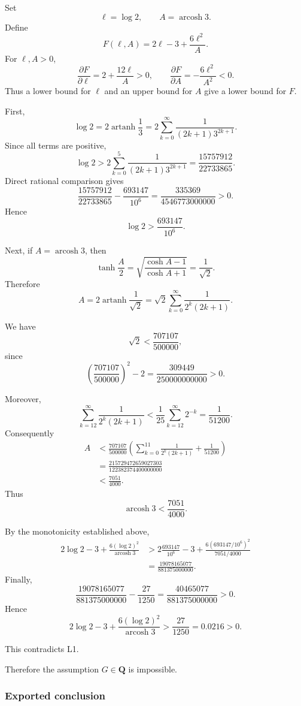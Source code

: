 \documentclass[
  10pt,
  letterpaper,
]{article}
\theoremstyle{definition}
\theoremstyle{remark}
\begin{document}
Set \[
\ell=\log2,
\qquad
A=\operatorname{arcosh}3.
\] Define \[
F(\ell,A)=2\ell-3+\frac{6\ell^2}{A}.
\] For \(\ell,A>0\), \[
\frac{\partial F}{\partial\ell}
=
2+\frac{12\ell}{A}>0,
\qquad
\frac{\partial F}{\partial A}
=
-\frac{6\ell^2}{A^2}<0.
\] Thus a lower bound for \(\ell\) and an upper bound for \(A\) give a
lower bound for \(F\).

First, \[
\log2
=
2\operatorname{artanh}\frac13
=
2\sum_{k=0}^{\infty}
\frac1{(2k+1)3^{2k+1}}.
\] Since all terms are positive, \[
\log2
>
2\sum_{k=0}^{5}
\frac1{(2k+1)3^{2k+1}}
=
\frac{15757912}{22733865}.
\] Direct rational comparison gives \[
\frac{15757912}{22733865}
-
\frac{693147}{10^6}
=
\frac{335369}{4546773000000}>0.
\] Hence \[
\boxed{\log2>\frac{693147}{10^6}.}
\]

Next, if \(A=\operatorname{arcosh}3\), then \[
\tanh\frac A2
=
\sqrt{\frac{\cosh A-1}{\cosh A+1}}
=
\frac1{\sqrt2}.
\] Therefore \[
A
=
2\operatorname{artanh}\frac1{\sqrt2}
=
\sqrt2\sum_{k=0}^{\infty}
\frac1{2^k(2k+1)}.
\]

We have \[
\sqrt2<\frac{707107}{500000},
\] since \[
\left(\frac{707107}{500000}\right)^2-2
=
\frac{309449}{250000000000}>0.
\]

Moreover, \[
\sum_{k=12}^{\infty}
\frac1{2^k(2k+1)}
<
\frac1{25}\sum_{k=12}^{\infty}2^{-k}
=
\frac1{51200}.
\] Consequently \[
\begin{aligned}
A
&<
\frac{707107}{500000}
\left(
\sum_{k=0}^{11}\frac1{2^k(2k+1)}
+\frac1{51200}
\right)\\
&=
\frac{215729472659027303}
{122382374400000000}\\
&<
\frac{7051}{4000}.
\end{aligned}
\] Thus \[
\boxed{
\operatorname{arcosh}3<\frac{7051}{4000}.
}
\]

By the monotonicity established above, \[
\begin{aligned}
2\log2-3+
\frac{6(\log2)^2}{\operatorname{arcosh}3}
&>
2\frac{693147}{10^6}-3
+
\frac{
6(693147/10^6)^2
}{
7051/4000
}\\
&=
\frac{19078165077}{881375000000}.
\end{aligned}
\] Finally, \[
\frac{19078165077}{881375000000}
-
\frac{27}{1250}
=
\frac{40465077}{881375000000}>0.
\] Hence \[
\boxed{
2\log2-3+
\frac{6(\log2)^2}{\operatorname{arcosh}3}
>
\frac{27}{1250}
=0.0216>0.
}
\]

This contradicts L1.

Therefore the assumption \(G\in\mathbf Q\) is impossible.

\subsubsection{Exported conclusion}\label{exported-conclusion}
\end{document}
